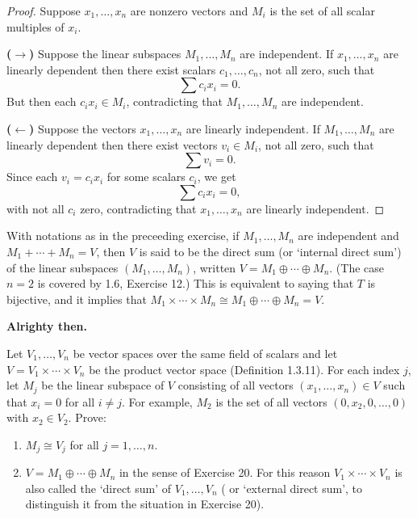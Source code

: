\begin{proof}
    Suppose $x_1, \ldots, x_n$ are nonzero vectors and $M_i$ is the set of all scalar multiples of $x_i$.

    \textbf{($\longrightarrow$)}
    Suppose the linear subspaces $M_1, \ldots, M_n$ are independent.
    If $x_1, \ldots, x_n$ are linearly dependent then there exist scalars $c_1,\ldots,c_n$, not all zero, such that 
    \[
    \sum c_i x_i = 0.
    \]
    But then each $c_i x_i \in M_i$, contradicting that $M_1,\ldots,M_n$ are independent.

    \textbf{($\longleftarrow$)}
    Suppose the vectors $x_1, \ldots, x_n$ are linearly independent.
    If $M_1, \ldots, M_n$ are linearly dependent then there exist vectors
    $v_i \in M_i$, not all zero, such that 
    \[
    \sum v_i = 0.
    \]
    Since each $v_i = c_i x_i$ for some scalars $c_i$, we get
    \[
    \sum c_i x_i = 0,
    \]
    with not all $c_i$ zero, contradicting that $x_1,\ldots,x_n$ are linearly independent.
\end{proof}


\begin{tcolorbox}[title=Problem 20, breakable]
    With notations as in the preceeding exercise, if 
    $M_1, \ldots, M_n$ are independent
    and $M_1 + \cdots + M_n = V$, then $V$ is said to be 
    the direct sum (or `internal direct sum') of the linear 
    subspaces $(M_1, \ldots, M_n)$, written 
    $V = M_1 \oplus \cdots \oplus M_n$.
    (The case $n = 2$ is covered by 1.6, Exercise 12.)
    This is equivalent to saying that $T$ is bijective,
    and it implies that 
    $M_1 \times \cdots \times M_n \cong M_1 \oplus \cdots \oplus M_n = V$.
\end{tcolorbox}

\textbf{Alrighty then.}


\begin{tcolorbox}[title=Problem 21, breakable]
    Let $V_1, \ldots, V_n$ be vector spaces over the same field 
    of scalars and let $V = V_1 \times \cdots \times V_n$ 
    be the product vector space (Definition 1.3.11).
    For each index $j$, let $M_j$  be the linear subspace of $V$ 
    consisting of all vectors $(x_1, \ldots, x_n) \in V$ such that 
    $x_i = 0$ for all $i \ne j$. {For example, $M_2$ is the set 
    of all vectors $(0, x_2, 0, \ldots, 0)$ with $x_2 \in V_2$.}
    Prove:
    \begin{enumerate}
        \item $M_j \cong V_j$ for all $j = 1, \ldots, n$.
        \item $V = M_1 \oplus \cdots \oplus M_n$ in the sense of 
        Exercise 20. {For this reason $V_1 \times \cdots \times V_n$ 
        is also called the `direct sum' of $V_1, \ldots, V_n$ (
            or `external direct sum', to distinguish it from the situation 
            in Exercise 20).
        }
    \end{enumerate}
\end{tcolorbox}

